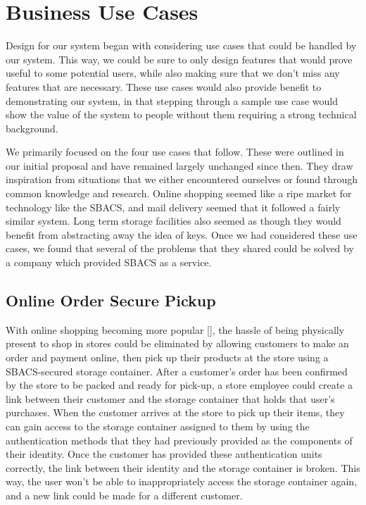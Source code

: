 \documentclass[12pt]{report}
\begin{document}

\chapter{Business Use Cases}

Design for our system began with considering use cases that could be handled by our system. This way, we could be sure
to only design features that would prove useful to some potential users, while also making sure that we don't miss any
features that are necessary. These use cases would also provide benefit to demonstrating our system, in that stepping
through a sample use case would show the value of the system to people without them requiring a strong technical
background.

We primarily focused on the four use cases that follow. These were outlined in our initial proposal and have remained
largely unchanged since then. They draw inspiration from situations that we either encountered ourselves or found
through common knowledge and research. Online shopping seemed like a ripe market for technology like the SBACS, and
mail delivery seemed that it followed a fairly similar system. Long term storage facilities also seemed as though they
would benefit from abstracting away the idea of keys. Once we had considered these use cases, we found that several of
the problems that they shared could be solved by a company which provided SBACS as a service.


\section{Online Order Secure Pickup}

With online shopping becoming more popular [], the hassle of being physically present to shop in stores 
could be eliminated by allowing customers to make an order and payment online, then pick up their products at the store 
using a SBACS-secured storage container. After a customer's order has been confirmed by the store to be packed 
and ready for pick-up, a store employee could create a link between their customer and the storage container that holds
that user's purchases. When the customer arrives at the store to pick up their items, 
they can gain access to the storage container assigned to them by using the authentication methods that they had
previously provided as the components of their identity. Once the customer has provided these authentication units
correctly, the link between their identity and the storage container is broken. This way, the user won't be able to
inappropriately access the storage container again, and a new link could be made for a different customer.
\end{document}
